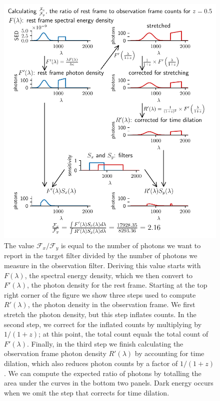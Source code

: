 \begin{figure}
  \includegraphics[width=\columnwidth]{k_equation_flow.pdf}
  \caption{The value $\mathcal{F}_x / \mathcal{F}_y$ is equal to the number of
  photons we want to report in the target filter divided by the number of
  photons we measure in the observation filter. Deriving this value starts with
  $F(\lambda)$, the spectral energy density, which we then convert to
  $F'(\lambda)$, the photon density for the rest frame. Starting at the top
  right corner of the figure we show three steps used to compute $R'(\lambda)$,
  the photon density in the observation frame. We first stretch the photon
  density, but this step inflates counts. In the second step, we correct for
  the inflated counts by multiplying by $1/(1+z)$; at this point, the total
  count equals the total count of $F'(\lambda)$. Finally, in the third step we
  finish calculating the observation frame photon density $R'(\lambda)$ by
  accounting for time dilation, which also reduces photon counts by a factor of
  $1/(1+z)$. We can compute the expected ratio of photons by totalling the area
  under the curves in the bottom two panels. Dark energy occurs when we omit
  the step that corrects for time dilation.
  }
  \label{fig:k-example}
\end{figure}


